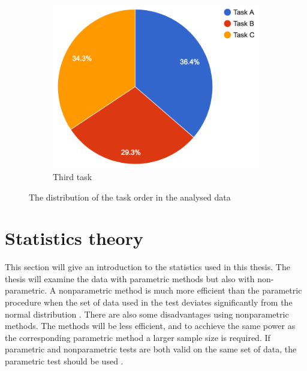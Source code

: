 \begin{figure}[H]
\begin{subfigure}[b]{0.32\textwidth}
		\includegraphics[width=\linewidth]{fig/thirdtask}
		\caption{Third task}
		\label{fig:thirdtask}
	\end{subfigure}
	\caption{The distribution of the task order in the analysed data}
	\label{fig:taskorderdistribution}
\end{figure}


\section{Statistics theory}\label{sec:statistic_theory}
This section will give an introduction to the statistics used in this thesis. The thesis will examine the data with parametric methods but also with non-parametric. A nonparametric method is much more efficient than the parametric procedure when the set of data used in the test deviates significantly from the normal distribution \citep{Walpole2012}. There are also some disadvantages using nonparametric methods. The methods will be less efficient, and to acchieve the same power as the corresponding parametric method a larger sample size is required. If parametric and nonparametric tests are both valid on the same set of data, the parametric test should be used \citep{Walpole2012}. 


